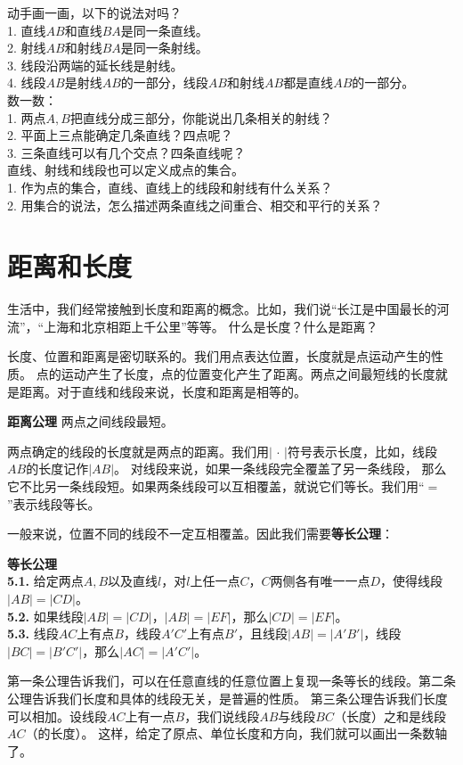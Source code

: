 \documentclass[12pt,UTF8]{ctexbook}
\begin{document}
\begin{sk}\label{sk:0-0-0}
    动手画一画，以下的说法对吗？\\
    1. 直线$AB$和直线$BA$是同一条直线。\\
    2. 射线$AB$和射线$BA$是同一条射线。\\
    3. 线段沿两端的延长线是射线。\\
    4. 线段$AB$是射线$AB$的一部分，线段$AB$和射线$AB$都是直线$AB$的一部分。\\
    数一数：\\
    1. 两点$A,B$把直线分成三部分，你能说出几条相关的射线？\\
    2. 平面上三点能确定几条直线？四点呢？\\
    3. 三条直线可以有几个交点？四条直线呢？\\
    直线、射线和线段也可以定义成点的集合。\\
    1. 作为点的集合，直线、直线上的线段和射线有什么关系？\\
    2. 用集合的说法，怎么描述两条直线之间重合、相交和平行的关系？
\end{sk}

\section{距离和长度}

生活中，我们经常接触到长度和距离的概念。比如，我们说“长江是中国最长的河流”，“上海和北京相距上千公里”等等。
什么是长度？什么是距离？

长度、位置和距离是密切联系的。我们用点表达位置，长度就是点运动产生的性质。
点的运动产生了长度，点的位置变化产生了距离。两点之间最短线的长度就是距离。对于直线和线段来说，长度和距离是相等的。
\begin{po}{\textbf{距离公理}}\label{po:3}
    两点之间线段最短。
\end{po}
两点确定的线段的长度就是两点的距离。我们用$ |\, \cdot\,|$符号表示长度，比如，线段$AB$的长度记作$|AB|$。
对线段来说，如果一条线段完全覆盖了另一条线段，
那么它不比另一条线段短。如果两条线段可以互相覆盖，就说它们等长。我们用“$=$”表示线段等长。

一般来说，位置不同的线段不一定互相覆盖。因此我们需要\textbf{等长公理}：
\begin{po}{\textbf{等长公理}}\label{po:4}
    \mbox{}\\
    \indent \textbf{5.1.} 给定两点$A,B$以及直线$l$，对$l$上任一点$C$，$C$两侧各有唯一一点$D$，使得线段$|AB| = |CD|$。\\
    \indent \textbf{5.2.} 如果线段$|AB| = |CD|$，$|AB| = |EF|$，那么$|CD| = |EF|$。\\
    \indent \textbf{5.3.} 线段$AC$上有点$B$，线段$A'C'$上有点$B'$，且线段$|AB| = |A'B'|$，线段$|BC| = |B'C'|$，那么$|AC| = |A'C'|$。
\end{po}
第一条公理告诉我们，可以在任意直线的任意位置上复现一条等长的线段。第二条公理告诉我们长度和具体的线段无关，是普遍的性质。
第三条公理告诉我们长度可以相加。设线段$AC$上有一点$B$，我们说线段$AB$与线段$BC$（长度）之和是线段$AC$（的长度）。
这样，给定了原点、单位长度和方向，我们就可以画出一条数轴了。
\end{document}
